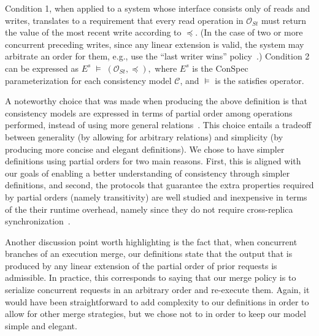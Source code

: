 \documentclass[journal,compsoc]{IEEEtran}
\begin{document}
Condition 1, when applied to a system whose interface consists only of reads and writes, translates to a requirement that every read operation in %
 ${\mathcal{O}_{St}}$ must return the value of the most recent write according to $\preccurlyeq$. (In the case of two or more concurrent preceding writes, since any linear extension is valid, the system may arbitrate an order for them, e.g., use the ``last writer wins'' policy~\cite{lww}.)
  Condition 2 can be expressed as $ E^s\; \vDash \; \left( {\mathcal{O}_{St}}, \preccurlyeq \right),$ where %
  $E^s$ is the ConSpec parameterization for each
 consistency model $\mathcal{C}$,
 and  $\vDash$ is the satisfies operator.
 \par A noteworthy choice that was made when producing the above definition is that consistency models are expressed in terms of  partial order among operations performed, instead of using more general relations~\cite{Burckhardt:2014:PEC:2693641.2693642}. This choice entails a tradeoff between generality (by allowing for arbitrary relations) and simplicity (by producing more concise and elegant definitions). We chose to have simpler definitions using partial orders for two main reasons. First, this is aligned with our goals of enabling a better understanding of consistency through simpler definitions, and second, the protocols that guarantee the extra properties required by partial orders (namely transitivity) are well studied and inexpensive in terms of the their runtime overhead, namely since they do not require cross-replica synchronization~\cite{Bailis:2013:BCC:2463676.2465279,Lloyd:2011:DSE:2043556.2043593}.

Another discussion point worth highlighting is the fact that, when concurrent branches of an execution merge, our definitions state that the output that is produced by any linear extension of the partial order of prior requests is admissible. In practice, this corresponds to saying that our merge policy is to serialize concurrent requests in an arbitrary order and re-execute them. Again, it would have been straightforward to add complexity to our definitions in order to allow for other merge strategies, but we chose not to in order to keep our model simple and elegant.
\end{document}
